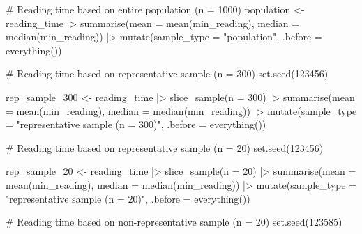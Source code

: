 \documentclass[
  letterpaper,
  DIV=11,
  numbers=noendperiod]{scrreprt}
\newenvironment{Shaded}{\begin{snugshade}}{\end{snugshade}}
\newcommand{\AttributeTok}[1]{\textcolor[rgb]{0.40,0.45,0.13}{#1}}
\newcommand{\CommentTok}[1]{\textcolor[rgb]{0.37,0.37,0.37}{#1}}
\newcommand{\DecValTok}[1]{\textcolor[rgb]{0.68,0.00,0.00}{#1}}
\newcommand{\FunctionTok}[1]{\textcolor[rgb]{0.28,0.35,0.67}{#1}}
\newcommand{\NormalTok}[1]{\textcolor[rgb]{0.00,0.23,0.31}{#1}}
\newcommand{\OtherTok}[1]{\textcolor[rgb]{0.00,0.23,0.31}{#1}}
\newcommand{\SpecialCharTok}[1]{\textcolor[rgb]{0.37,0.37,0.37}{#1}}
\newcommand{\StringTok}[1]{\textcolor[rgb]{0.13,0.47,0.30}{#1}}
\begin{document}
\begin{Shaded}
\begin{Highlighting}[]
\CommentTok{\# Reading time based on entire population (n = 1000)}
\NormalTok{population }\OtherTok{\textless{}{-}}\NormalTok{ reading\_time }\SpecialCharTok{|\textgreater{}}
  \FunctionTok{summarise}\NormalTok{(}\AttributeTok{mean =} \FunctionTok{mean}\NormalTok{(min\_reading),}
            \AttributeTok{median =} \FunctionTok{median}\NormalTok{(min\_reading)) }\SpecialCharTok{|\textgreater{}}
  \FunctionTok{mutate}\NormalTok{(}\AttributeTok{sample\_type =} \StringTok{"population"}\NormalTok{,}
         \AttributeTok{.before =} \FunctionTok{everything}\NormalTok{())}


\CommentTok{\# Reading time based on representative sample (n = 300)}
\FunctionTok{set.seed}\NormalTok{(}\DecValTok{123456}\NormalTok{)}

\NormalTok{rep\_sample\_300 }\OtherTok{\textless{}{-}}
\NormalTok{  reading\_time }\SpecialCharTok{|\textgreater{}}
  \FunctionTok{slice\_sample}\NormalTok{(}\AttributeTok{n =} \DecValTok{300}\NormalTok{) }\SpecialCharTok{|\textgreater{}}
  \FunctionTok{summarise}\NormalTok{(}\AttributeTok{mean =} \FunctionTok{mean}\NormalTok{(min\_reading),}
            \AttributeTok{median =} \FunctionTok{median}\NormalTok{(min\_reading)) }\SpecialCharTok{|\textgreater{}}
  \FunctionTok{mutate}\NormalTok{(}\AttributeTok{sample\_type =} \StringTok{"representative sample (n = 300)"}\NormalTok{,}
         \AttributeTok{.before =} \FunctionTok{everything}\NormalTok{())}

\CommentTok{\# Reading time based on representative sample (n = 20)}
\FunctionTok{set.seed}\NormalTok{(}\DecValTok{123456}\NormalTok{)}

\NormalTok{rep\_sample\_20 }\OtherTok{\textless{}{-}}
\NormalTok{  reading\_time }\SpecialCharTok{|\textgreater{}}
  \FunctionTok{slice\_sample}\NormalTok{(}\AttributeTok{n =} \DecValTok{20}\NormalTok{) }\SpecialCharTok{|\textgreater{}}
  \FunctionTok{summarise}\NormalTok{(}\AttributeTok{mean =} \FunctionTok{mean}\NormalTok{(min\_reading),}
            \AttributeTok{median =} \FunctionTok{median}\NormalTok{(min\_reading)) }\SpecialCharTok{|\textgreater{}}
  \FunctionTok{mutate}\NormalTok{(}\AttributeTok{sample\_type =} \StringTok{"representative sample (n = 20)"}\NormalTok{,}
         \AttributeTok{.before =} \FunctionTok{everything}\NormalTok{())}

\CommentTok{\# Reading time based on non{-}representative sample (n = 20)}
\FunctionTok{set.seed}\NormalTok{(}\DecValTok{123585}\NormalTok{)}


\end{Highlighting}
\end{Shaded}
\end{document}

